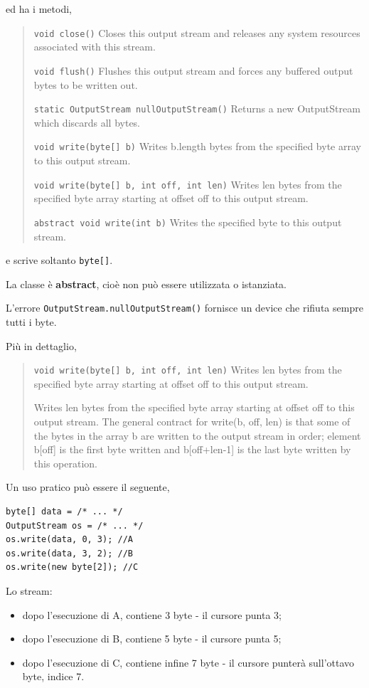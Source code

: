 \documentclass[\fontsizeclass,twocolumn]{\classname}
\theoremstyle{definition}
\theoremstyle{definition}
\begin{document}
ed ha i metodi,
\begin{quote}
    \footnotesize{\texttt{void 	close()} 	Closes this output stream and releases any system resources associated with this stream.

            \texttt{void 	flush()} 	Flushes this output stream and forces any buffered output bytes to be written out.

    \texttt{static OutputStream 	nullOutputStream()} 	Returns a new OutputStream which discards all bytes.

    \texttt{void 	write(byte[] b)} 	Writes b.length bytes from the specified byte array to this output stream.

    \texttt{void 	write(byte[] b, int off, int len)} 	Writes len bytes from the specified byte array starting at offset off to this output stream.

\texttt{abstract void 	write(int b)} 	Writes the specified byte to this output stream.}

\end{quote}

e scrive soltanto \texttt{byte[]}.

La classe è \textbf{abstract}, cioè non può essere utilizzata o istanziata.

L'errore \texttt{OutputStream.nullOutputStream()} fornisce un device che
rifiuta sempre tutti i byte.

Più in dettaglio,
\begin{quote}
    \footnotesize{\texttt{void 	write(byte[] b, int off, int len)} 	Writes len bytes from the specified byte array starting at offset off to this output stream.

Writes len bytes from the specified byte array starting at offset off to this output stream. The general contract for write(b, off, len) is that some of the bytes in the array b are written to the output stream in order; element b[off] is the first byte written and b[off+len-1] is the last byte written by this operation.}
\end{quote}

Un uso pratico può essere il seguente,

\begin{lstlisting}
byte[] data = /* ... */
OutputStream os = /* ... */
os.write(data, 0, 3); //A
os.write(data, 3, 2); //B
os.write(new byte[2]); //C
\end{lstlisting}

Lo stream:
\begin{itemize}
    \item dopo l'esecuzione di A, contiene 3 byte \-- il cursore punta 3;
    \item dopo l'esecuzione di B, contiene 5 byte \-- il cursore punta 5;
    \item dopo l'esecuzione di C, contiene infine 7 byte \-- il cursore punterà
        sull'ottavo byte, indice 7.
\end{itemize}
\end{document}
